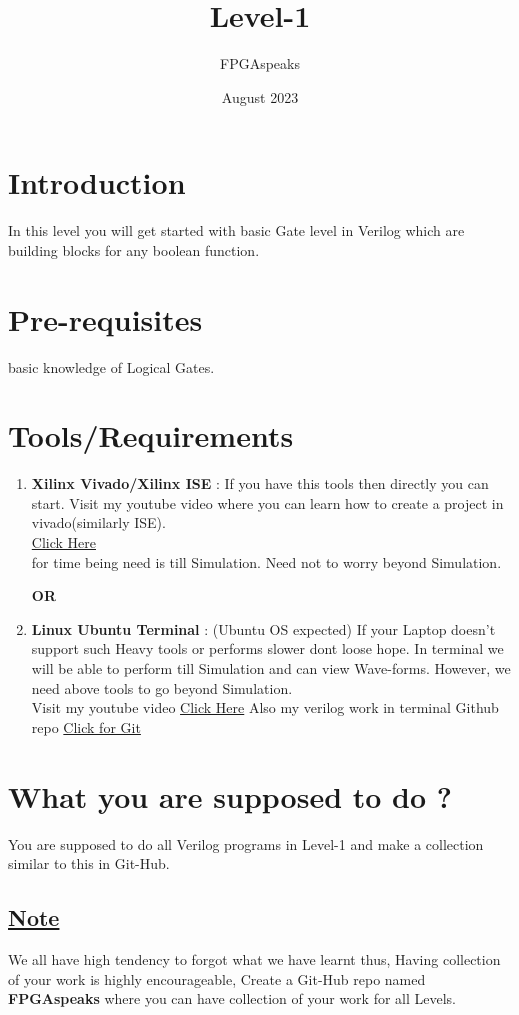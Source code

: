 \documentclass{article}
\title{\huge {\textbf{Level-1}}}
\author{FPGAspeaks}
\date{August 2023}
\begin{document}
\maketitle
\section{Introduction}
In this level you will get started with basic Gate level in Verilog which are building blocks for any boolean function. 
\section{Pre-requisites}
basic knowledge of Logical Gates.
\section{Tools/Requirements}
\begin{enumerate}
    \item \textbf{Xilinx Vivado/Xilinx ISE }: If you have this tools then directly you can start. Visit my youtube video where you can learn how to create a project in vivado(similarly ISE).\\
\href{https://www.youtube.com/watch?v=-aOc2moMT_I}{Click Here}\\
for time being need is till Simulation. Need not to worry beyond Simulation.\\
\begin{center}
    \textbf{OR}
\end{center} 
\item \textbf{Linux Ubuntu Terminal }: (Ubuntu OS expected) If your Laptop doesn't support such Heavy tools or performs slower dont loose hope. In terminal we will be able to perform till Simulation and can view Wave-forms. However, we need above tools to go beyond Simulation.\\
Visit my youtube video  \href{https://youtu.be/92rmMcu5vGQ}{Click Here}
Also my verilog work in terminal Github repo \href{https://github.com/koushikkalyani/Iverilog}{Click for Git}
\end{enumerate}
\section{What you are supposed to do ? }You are supposed to do all Verilog programs in Level-1 and make a collection similar to this in Git-Hub.
\subsection{\underline{Note}}We all have high tendency to forgot what we have learnt thus, Having collection of your work is highly encourageable, Create a Git-Hub repo named \textbf{FPGAspeaks} where you can have collection of your work for all Levels.
\end{document}
